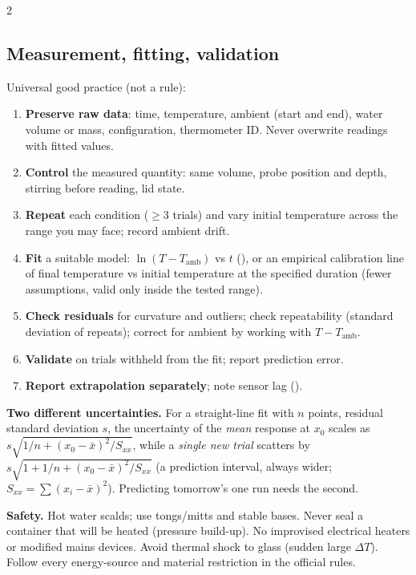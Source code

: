 \begin{multicols}{2}
\subsection{Measurement, fitting, validation}\label{sec:devicecal}
\CORE{} Universal good practice (not a rule):
\begin{enumerate}
\item \textbf{Preserve raw data}: time, temperature, ambient (start and end), water volume or mass, configuration, thermometer ID. Never overwrite readings with fitted values.
\item \textbf{Control} the measured quantity: same volume, probe position and depth, stirring before reading, lid state.
\item \textbf{Repeat} each condition ($\ge3$ trials) and vary initial temperature across the range you may face; record ambient drift.
\item \textbf{Fit} a suitable model: $\ln(T-T_{\text{amb}})$ vs $t$ (), or an empirical calibration line of final temperature vs initial temperature at the specified duration (fewer assumptions, valid only inside the tested range).
\item \textbf{Check residuals} for curvature and outliers; check repeatability (standard deviation of repeats); correct for ambient by working with $T-T_{\text{amb}}$.
\item \textbf{Validate} on trials withheld from the fit; report prediction error.
\item \textbf{Report extrapolation separately}; note sensor lag ().
\end{enumerate}

\textbf{Two different uncertainties.} For a straight-line fit with $n$ points, residual standard deviation $s$, the uncertainty of the \emph{mean} response at $x_0$ scales as $s\sqrt{1/n+(x_0-\bar x)^2/S_{xx}}$, while a \emph{single new trial} scatters by $s\sqrt{1+1/n+(x_0-\bar x)^2/S_{xx}}$ (a prediction interval, always wider; $S_{xx}=\sum(x_i-\bar x)^2$). Predicting tomorrow's one run needs the second.

\begin{trapbox}\textbf{Safety.} Hot water scalds; use tongs/mitts and stable bases. Never seal a container that will be heated (pressure build-up). No improvised electrical heaters or modified mains devices. Avoid thermal shock to glass (sudden large $\Delta T$). Follow every energy-source and material restriction in the official rules.\end{trapbox}
\end{multicols}

